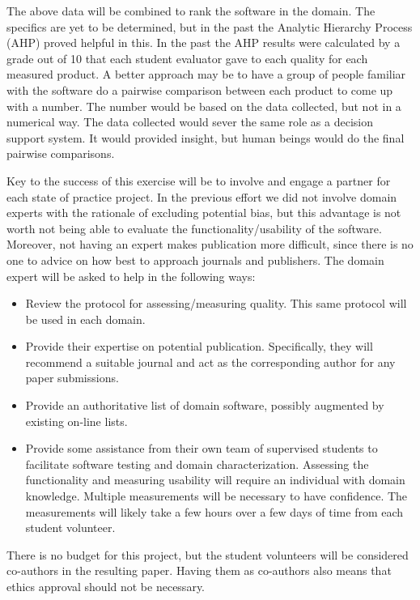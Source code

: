 \documentclass[12pt]{article}
\begin{document}
The above data will be combined to rank the software in the domain.  The
specifics are yet to be determined, but in the past the Analytic Hierarchy
Process (AHP) \citep{Saaty1980} proved helpful in this.  In the past the AHP
results were calculated by a grade out of 10 that each student evaluator gave to
each quality for each measured product.  A better approach may be to have a
group of people familiar with the software do a pairwise comparison between each
product to come up with a number.  The number would be based on the data
collected, but not in a numerical way.  The data collected would sever the same
role as a decision support system.  It would provided insight, but human beings
would do the final pairwise comparisons.

Key to the success of this exercise will be to involve and engage a partner for
each state of practice project.  In the previous effort we did not involve domain
experts with the rationale of excluding potential bias, but this advantage is
not worth not being able to evaluate the functionality/usability of the software.
Moreover, not having an expert makes publication more difficult, since there is
no one to advice on how best to approach journals and publishers.  The domain
expert will be asked to help in the following ways:

\begin{itemize}
\item Review the protocol for assessing/measuring quality.  This same protocol
  will be used in each domain.
\item Provide their expertise on potential publication.  Specifically, they will
  recommend a suitable journal and act as the corresponding author for any paper
  submissions. 
\item Provide an authoritative list of domain software, possibly augmented by
  existing on-line lists.
\item Provide some assistance from their own team of supervised students to
  facilitate software testing and domain characterization.  Assessing the
  functionality and measuring usability will require an individual with domain
  knowledge.  Multiple measurements will be necessary to have confidence.  The
  measurements will likely take a few hours over a few days of time from each
  student volunteer.
\end{itemize}

There is no budget for this project, but the student volunteers will be
considered co-authors in the resulting paper.  Having them as co-authors also
means that ethics approval should not be necessary.
\end{document}
